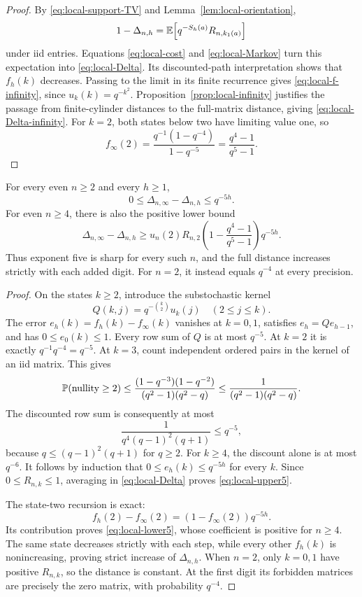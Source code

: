 \begin{proof}
By \eqref{eq:local-support-TV} and
Lemma~\ref{lem:local-orientation},
\[
 1-\Delta_{n,h}
   =\mathbb E\!\left[q^{-S_h(a)}R_{n,k_1(a)}\right]
\]
under iid entries.
Equations \eqref{eq:local-cost} and \eqref{eq:local-Markov} turn
this expectation into \eqref{eq:local-Delta}.
Its discounted-path interpretation shows that \(f_h(k)\) decreases.
Passing to the limit in its finite recurrence gives
\eqref{eq:local-f-infinity}, since
\(u_k(k)=q^{-k^2}\).
Proposition~\ref{prop:local-infinity} justifies the passage from
finite-cylinder distances to the full-matrix distance, giving
\eqref{eq:local-Delta-infinity}.
For \(k=2\), both states below two have limiting value one, so
\[
 f_\infty(2)
   =\frac{q^{-1}(1-q^{-4})}{1-q^{-5}}
   =\frac{q^4-1}{q^5-1}.
\]
\end{proof}

\begin{theorem}
\label{thm:local-five}
For every even \(n\ge2\) and every \(h\ge1\),
\[
 0\le\Delta_{n,\infty}-\Delta_{n,h}\le q^{-5h}.
 \tag{L23}\label{eq:local-upper5}
\]
For even \(n\ge4\), there is also the positive lower bound
\[
 \Delta_{n,\infty}-\Delta_{n,h}
 \ge
 u_n(2)R_{n,2}
 \left(1-\frac{q^4-1}{q^5-1}\right)q^{-5h}.
 \tag{L24}\label{eq:local-lower5}
\]
Thus exponent five is sharp for every such \(n\), and the full
distance increases strictly with each added digit.
For \(n=2\), it instead equals \(q^{-4}\) at every precision.
\end{theorem}

\begin{proof}
On the states \(k\ge2\), introduce the substochastic kernel
\[
 Q(k,j)=q^{-\binom k2}u_k(j)\quad(2\le j\le k).
\]
The error \(e_h(k)=f_h(k)-f_\infty(k)\) vanishes at \(k=0,1\),
satisfies \(e_h=Qe_{h-1}\), and has \(0\le e_0(k)\le1\).
Every row sum of \(Q\) is at most \(q^{-5}\).
At \(k=2\) it is exactly \(q^{-1}q^{-4}=q^{-5}\).
At \(k=3\), count independent ordered pairs in the kernel of an
iid matrix. This gives
\[
 \mathbb P(\text{nullity}\ge2)
 \le\frac{(1-q^{-3})(1-q^{-2})}
          {(q^2-1)(q^2-q)}
 \le\frac1{(q^2-1)(q^2-q)}.
\]
The discounted row sum is consequently at most
\[
 \frac1{q^4(q-1)^2(q+1)}\le q^{-5},
\]
because \(q\le(q-1)^2(q+1)\) for \(q\ge2\).
For \(k\ge4\), the discount alone is at most \(q^{-6}\).
It follows by induction that
\(0\le e_h(k)\le q^{-5h}\) for every \(k\).
Since \(0\le R_{n,k}\le1\), averaging in
\eqref{eq:local-Delta} proves \eqref{eq:local-upper5}.

The state-two recursion is exact:
\[
 f_h(2)-f_\infty(2)
      =(1-f_\infty(2))q^{-5h}.
\]
Its contribution proves \eqref{eq:local-lower5}, whose coefficient
is positive for \(n\ge4\).
The same state decreases strictly with each step, while every
other \(f_h(k)\) is nonincreasing, proving strict increase of
\(\Delta_{n,h}\).
When \(n=2\), only \(k=0,1\) have positive \(R_{n,k}\), so the
distance is constant. At the first digit its forbidden matrices
are precisely the zero matrix, with probability \(q^{-4}\).
\end{proof}

